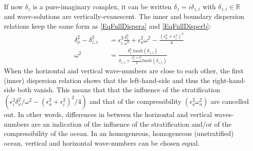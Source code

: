 \documentclass[a4paper,11pt]{article}
\begin{document}
If now $\delta_z$ is a pure-imaginary complex, it can be written $\delta_z=i\delta_{z,i}$ with $\delta_{z,i}\in\mathbb{R}$ and wave-solutions are vertically-evanescent. The inner and boundary dispersion relations keep the same form as \ref{EqFullDispera} and \ref{EqFullDisperb}:
\begin{subequations}
	\label{EqFullDisperi}
	\begin{alignat}{2}	
		\label{EqFullDisperai}
 		& \delta_x^2-\delta_{z,i}^2 &&=\epsilon_i^2\frac{\delta_x^2}
 			{\omega^2}+\epsilon_a^2\omega^2-\frac{(\epsilon_a^2+\epsilon_i^2)^2}{4}\\[3mm]
		\label{EqFullDisperbi}
		& \omega^2 &&=\frac{\delta_x^2\ tanh(\delta_{z,i})}
		{\delta_{z,i}+\frac{\epsilon_a^2+\epsilon_i^2}			{2}tanh(\delta_{z,i})}
	\end{alignat}
\end{subequations}
When the horizontal and vertical wave-numbers are close to each other, the first (inner) dispersion relation shows that the left-hand-side and thus the right-hand-side both vanish. This means that that the influence of the stratification $(\epsilon_i^2\delta_x^2/\omega^2-(\epsilon_a^2+\epsilon_i^2)^2/4)$ and that of the compressibility $(\epsilon_a^2\omega_a^2)$ are cancelled out. In other words, differences in between the horizontal and vertical waves-numbers are an indication of the influence of the stratification and/or of the compressibility of the ocean. In an homogeneous, homogeneous (unstratified) ocean, vertical and horizontal wave-numbers can be chosen equal.\\
\end{document}
